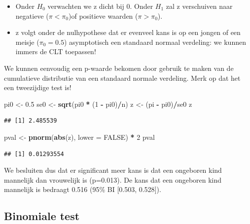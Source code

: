 \documentclass[
  12pt,dutch]{book}
\newenvironment{Shaded}{\begin{snugshade}}{\end{snugshade}}
\newcommand{\AttributeTok}[1]{\textcolor[rgb]{0.13,0.29,0.53}{#1}}
\newcommand{\ConstantTok}[1]{\textcolor[rgb]{0.56,0.35,0.01}{#1}}
\newcommand{\DecValTok}[1]{\textcolor[rgb]{0.00,0.00,0.81}{#1}}
\newcommand{\FloatTok}[1]{\textcolor[rgb]{0.00,0.00,0.81}{#1}}
\newcommand{\FunctionTok}[1]{\textcolor[rgb]{0.13,0.29,0.53}{\textbf{#1}}}
\newcommand{\NormalTok}[1]{#1}
\newcommand{\OtherTok}[1]{\textcolor[rgb]{0.56,0.35,0.01}{#1}}
\newcommand{\SpecialCharTok}[1]{\textcolor[rgb]{0.81,0.36,0.00}{\textbf{#1}}}
\theoremstyle{definition}
\theoremstyle{definition}
\theoremstyle{definition}
\theoremstyle{definition}
\theoremstyle{remark}
\begin{document}
\begin{itemize}
\item
  Onder \(H_0\) verwachten we z dicht bij 0. Onder \(H_1\) zal z verschuiven naar negatieve (\(\pi < \pi_0\))of positieve waarden (\(\pi>\pi_0\)).
\item
  z volgt onder de nulhypothese dat er evenveel kans is op een jongen of een meisje (\(\pi_0=0.5\)) asymptotisch een standaard normaal verdeling: we kunnen immers de CLT toepassen!
\end{itemize}

We kunnen eenvoudig een p-waarde bekomen door gebruik te maken van de cumulatieve distributie van een standaard normale verdeling. Merk op dat het een tweezijdige test is!

\begin{Shaded}
\begin{Highlighting}[]
\NormalTok{pi0 }\OtherTok{\textless{}{-}} \FloatTok{0.5}
\NormalTok{se0 }\OtherTok{\textless{}{-}} \FunctionTok{sqrt}\NormalTok{(pi0 }\SpecialCharTok{*}\NormalTok{ (}\DecValTok{1} \SpecialCharTok{{-}}\NormalTok{ pi0)}\SpecialCharTok{/}\NormalTok{n)}
\NormalTok{z }\OtherTok{\textless{}{-}}\NormalTok{ (pi }\SpecialCharTok{{-}}\NormalTok{ pi0)}\SpecialCharTok{/}\NormalTok{se0}
\NormalTok{z}
\end{Highlighting}
\end{Shaded}

\begin{verbatim}
## [1] 2.485539
\end{verbatim}

\begin{Shaded}
\begin{Highlighting}[]
\NormalTok{pval }\OtherTok{\textless{}{-}} \FunctionTok{pnorm}\NormalTok{(}\FunctionTok{abs}\NormalTok{(z), }\AttributeTok{lower =} \ConstantTok{FALSE}\NormalTok{) }\SpecialCharTok{*} \DecValTok{2}
\NormalTok{pval}
\end{Highlighting}
\end{Shaded}

\begin{verbatim}
## [1] 0.01293554
\end{verbatim}

We besluiten dus dat er significant meer kans is dat een ongeboren kind mannelijk dan vrouwelijk is (p=0.013). De kans dat een ongeboren kind mannelijk is bedraagt 0.516 (95\% BI {[}0.503, 0.528{]}).

\subsection{Binomiale test}\label{subsec:binom}
\end{document}
